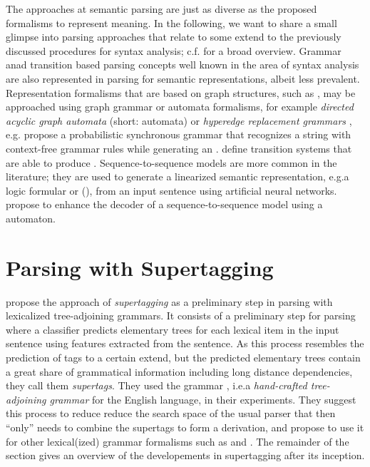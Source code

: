 \documentclass[../document.tex]{subfiles}
\begin{document}
    The approaches at semantic parsing are just as diverse as the proposed formalisms to represent meaning.
    In the following, we  want to share a small glimpse into parsing approaches that relate to some extend to the previously discussed procedures for syntax analysis; c.f.\@ \citet{kamath2018survey} for a broad overview.
    Grammar anad transition based parsing concepts well known in the area of syntax analysis are also represented in parsing for semantic representations, albeit less prevalent.
    Representation formalisms that are based on graph structures, such as , may be approached using graph grammar or automata formalisms, for example \emph{directed acyclic graph automata} (short:  automata) \citep{fancellu2019semantic} or \emph{hyperedge replacement grammars} \citep{drewes1997hyperedge}, e.g.\@ \citet{peng2015synchronous} propose a probabilistic synchronous grammar that recognizes a string with context-free grammar rules while generating an .
    \citet{peng2018amr,vilares-gomez-rodriguez-2018-transition} define transition systems that are able to produce .
    Sequence-to-sequence models are more common in the literature; they are used to generate a linearized semantic representation, e.g.\@ a logic formular \citep{dong-lapata-2016-language} or  (\citep{zhang-etal-2019-amr}), from an input sentence using artificial neural networks.
    \citet{fancellu2019semantic} propose to enhance the decoder of a sequence-to-sequence model using a  automaton.

    \section{Parsing with Supertagging}\label{sec:literature:supertagging}
    \citet{bangalore1999supertagging} propose the approach of \emph{supertagging} as a preliminary step in parsing with lexicalized tree-adjoining grammars.
    It consists of a preliminary step for parsing where a classifier predicts elementary trees for each lexical item in the input sentence using features extracted from the sentence.
    As this process resembles the prediction of  tags to a certain extend, but the predicted elementary trees contain a great share of grammatical information including long distance dependencies, they call them \emph{supertags}.
    They used the  grammar \citep{xtag01}, i.e.\@ a \emph{hand-crafted tree-adjoining grammar} for the English language, in their experiments. 
    They suggest this process to reduce reduce the search space of the usual parser that then ``only'' needs to combine the supertags to form a derivation, and propose to use it for other lexical(ized) grammar formalisms such as  and .
    The remainder of the section gives an overview of the developements in supertagging after its inception.
\end{document}
